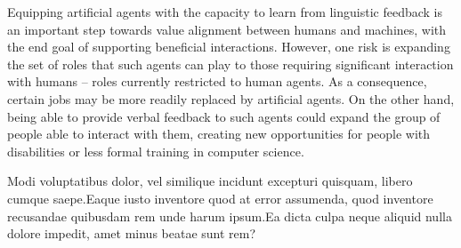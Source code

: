 \documentclass[letterpaper]{article} %
\begin{document}
Equipping artificial agents with the capacity to learn from linguistic feedback is an important step towards value alignment between humans and machines, with the end goal of supporting beneficial interactions. However, one risk is expanding the set of roles that such agents can play to those requiring significant interaction with humans --  roles currently restricted to human agents. As a consequence, certain jobs may be more readily replaced by artificial agents. On the other hand, being able to provide verbal feedback to such agents could expand the group of people able to interact with them, creating new opportunities for people with disabilities or less formal training in computer science.

\small
Modi voluptatibus dolor, vel similique incidunt excepturi quisquam, libero cumque saepe.Eaque iusto inventore quod at error assumenda, quod inventore recusandae quibusdam rem unde harum ipsum.Ea dicta culpa neque aliquid nulla dolore impedit, amet minus beatae sunt rem?\clearpage

\end{document}
